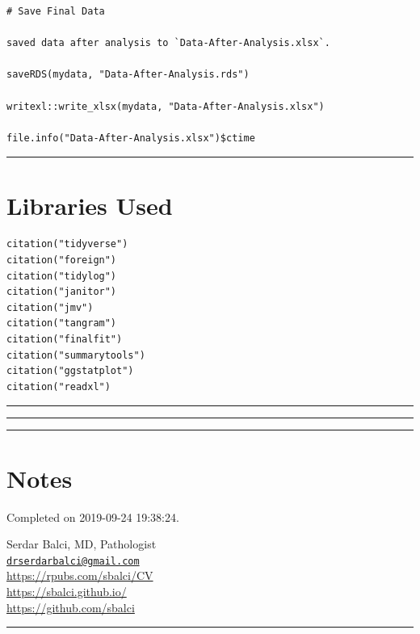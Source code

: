 \documentclass[]{article}
\begin{document}
\begin{verbatim}
# Save Final Data

saved data after analysis to `Data-After-Analysis.xlsx`.

saveRDS(mydata, "Data-After-Analysis.rds")

writexl::write_xlsx(mydata, "Data-After-Analysis.xlsx")

file.info("Data-After-Analysis.xlsx")$ctime
\end{verbatim}

\begin{center}\rule{0.5\linewidth}{\linethickness}\end{center}

\hypertarget{libraries-used}{%
\section{Libraries Used}\label{libraries-used}}

\begin{verbatim}
citation("tidyverse")
citation("foreign")
citation("tidylog")
citation("janitor")
citation("jmv")
citation("tangram")
citation("finalfit")
citation("summarytools")
citation("ggstatplot")
citation("readxl")
\end{verbatim}

\begin{center}\rule{0.5\linewidth}{\linethickness}\end{center}

\begin{center}\rule{0.5\linewidth}{\linethickness}\end{center}

\begin{center}\rule{0.5\linewidth}{\linethickness}\end{center}

\hypertarget{notes}{%
\section{Notes}\label{notes}}

Completed on 2019-09-24 19:38:24.

Serdar Balci, MD, Pathologist\\
\href{mailto:drserdarbalci@gmail.com}{\nolinkurl{drserdarbalci@gmail.com}}\\
\url{https://rpubs.com/sbalci/CV}~\\
\url{https://sbalci.github.io/}~\\
\url{https://github.com/sbalci}

\begin{center}\rule{0.5\linewidth}{\linethickness}\end{center}
\end{document}
